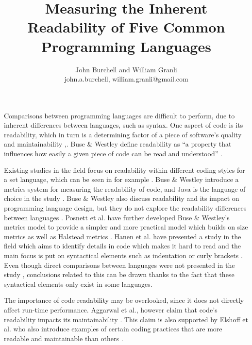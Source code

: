 \documentclass[10pt,twocolumn]{article}
\begin{document}
\title{Measuring the Inherent Readability of Five Common Programming Languages}

\author{John Burchell and William Granli \\
john.a.burchell, william.granli@gmail.com}




\maketitle
\thispagestyle{empty}


Comparisons between programming languages are difficult to perform, due to inherent differences between languages, such as syntax. One aspect of code is its readability, which in turn is a determining factor of a piece of software's quality and maintainability \cite{aggarwal2002integrated},\cite{elshoff1982improving}. Buse \& Westley define readability as ``a property that influences how easily a given piece of code can be read and understood'' \cite{buse2010learning}. 

Existing studies in the field focus on readability within different coding styles for a set language, which can be seen in for example \cite{buse2010learning}. Buse \& Westley introduce a metrics system for measuring the readability of code, and Java is the language of choice in the study \cite{buse2010learning}. Buse \& Westley also discuss readability and its impact on programming language design, but they do not explore the readability differences between languages \cite{buse2010learning}. Posnett et al. \cite{posnett2011simpler} have further developed Buse \& Westley's metrics model to provide a simpler and more practical model which builds on size metrics as well as Halstead metrics \cite{halstead1977elements}. Hanen et al. have presented a study in the field which aims to identify details in code which makes it hard to read and the main focus is put on syntactical elements such as indentation or curly brackets \cite{hansen2013makes}. Even though direct comparisons between languages were not presented in the study \cite{hansen2013makes}, conclusions related to this can be drawn thanks to the fact that these syntactical elements only exist in some languages. 

The importance of code readability may be overlooked, since it does not directly affect run-time performance. Aggarwal et al., however claim that code's readability impacts its maintainability \cite{aggarwal2002integrated}. This claim is also supported by \cite{elshoff1982improving} Elshoff et al. who also introduce examples of certain coding practices that are more readable and maintainable than others \cite{elshoff1982improving}.
\end{document}
